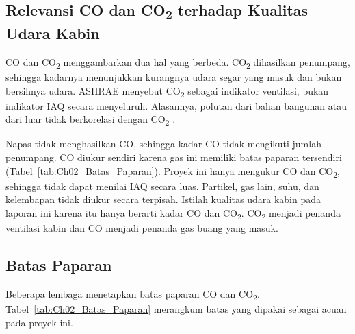     \subsection{Relevansi CO dan CO\texorpdfstring{\textsubscript{2}}{2} terhadap Kualitas Udara Kabin}

    CO dan CO\textsubscript{2} menggambarkan dua hal yang berbeda. CO\textsubscript{2} dihasilkan penumpang, sehingga kadarnya menunjukkan kurangnya udara segar yang masuk dan bukan bersihnya udara. ASHRAE menyebut CO\textsubscript{2} sebagai indikator ventilasi, bukan indikator IAQ secara menyeluruh. Alasannya, polutan dari bahan bangunan atau dari luar tidak berkorelasi dengan CO\textsubscript{2} \cite{ashrae_co2}.

    Napas tidak menghasilkan CO, sehingga kadar CO tidak mengikuti jumlah penumpang. CO diukur sendiri karena gas ini memiliki batas paparan tersendiri (Tabel~\ref{tab:Ch02_Batas_Paparan}). Proyek ini hanya mengukur CO dan CO\textsubscript{2}, sehingga tidak dapat menilai IAQ secara luas. Partikel, gas lain, suhu, dan kelembapan tidak diukur secara terpisah. Istilah kualitas udara kabin pada laporan ini karena itu hanya berarti kadar CO dan CO\textsubscript{2}. CO\textsubscript{2} menjadi penanda ventilasi kabin dan CO menjadi penanda gas buang yang masuk.

    \subsection{Batas Paparan}

    Beberapa lembaga menetapkan batas paparan CO dan CO\textsubscript{2}. Tabel~\ref{tab:Ch02_Batas_Paparan} merangkum batas yang dipakai sebagai acuan pada proyek ini.

